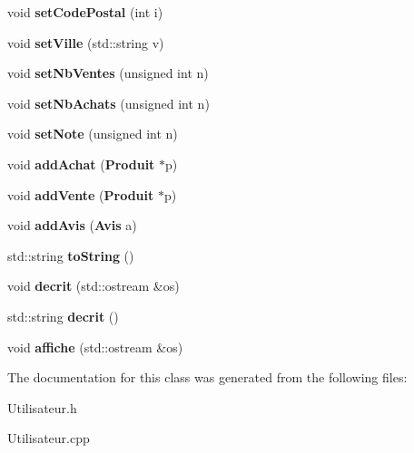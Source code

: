 \begin{DoxyCompactItemize}
\item 
void {\bfseries set\-Code\-Postal} (int i)\label{class_utilisateur_add56a5bbbb2507f5e1a5c6100c3c756a}

\item 
void {\bfseries set\-Ville} (std\-::string v)\label{class_utilisateur_a8a3b372a5f6086e009ebaf6135b570a9}

\item 
void {\bfseries set\-Nb\-Ventes} (unsigned int n)\label{class_utilisateur_a8d788360b66d30182485926d8082acef}

\item 
void {\bfseries set\-Nb\-Achats} (unsigned int n)\label{class_utilisateur_aaff8554723c390a541f223065ba68f22}

\item 
void {\bfseries set\-Note} (unsigned int n)\label{class_utilisateur_a703b2dbde2ba4e30fceefa651d4ab51f}

\item 
void {\bfseries add\-Achat} ({\bf Produit} $\ast$p)\label{class_utilisateur_a0f2ef558d9a70caf2bccfc81f15027fc}

\item 
void {\bfseries add\-Vente} ({\bf Produit} $\ast$p)\label{class_utilisateur_ac388127f7ea147a70a67ff6345ccb164}

\item 
void {\bfseries add\-Avis} ({\bf Avis} a)\label{class_utilisateur_aa8b2cad2349702cf2fa8f23fef2e5a9d}

\item 
std\-::string {\bfseries to\-String} ()\label{class_utilisateur_afae5a6088d13c5f622362f47faaa49d4}

\item 
void {\bfseries decrit} (std\-::ostream \&os)\label{class_utilisateur_ad4c1dbab122bf719cf1419b9d93a0e22}

\item 
std\-::string {\bfseries decrit} ()\label{class_utilisateur_a938eda997ac76805b7674c7ffe7e17e8}

\item 
void {\bfseries affiche} (std\-::ostream \&os)\label{class_utilisateur_a810f877d63ef4b8b2f6b18dfc1cd26f9}

\end{DoxyCompactItemize}


The documentation for this class was generated from the following files\-:\begin{DoxyCompactItemize}
\item 
Utilisateur.\-h\item 
Utilisateur.\-cpp\end{DoxyCompactItemize}
